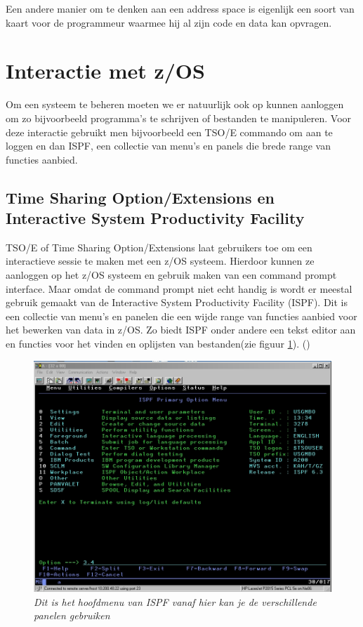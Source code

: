 Een andere manier om te denken aan een address space is eigenlijk een soort van kaart voor de programmeur waarmee hij al zijn code en data kan opvragen.

\section{Interactie met z/OS}
\label{sec:interactie met z/OS}

Om een systeem te beheren moeten we er natuurlijk ook op kunnen aanloggen om zo bijvoorbeeld programma's te schrijven of bestanden te manipuleren. Voor deze interactie gebruikt men bijvoorbeeld een TSO/E commando om aan te loggen en dan ISPF, een collectie van menu's en panels die brede range van functies aanbied.

\subsection{Time Sharing Option/Extensions en Interactive System Productivity Facility}
\label{subsec:Time Sharing Option}

TSO/E of Time Sharing Option/Extensions laat gebruikers toe om een interactieve sessie te maken met een z/OS systeem. Hierdoor kunnen ze aanloggen op het z/OS systeem en gebruik maken van een command prompt interface. Maar omdat de command prompt niet echt handig is wordt er meestal gebruik gemaakt van de Interactive System Productivity Facility (ISPF). Dit is een collectie van menu's en panelen die een wijde range van functies aanbied voor het bewerken van data in z/OS. Zo biedt ISPF onder andere een tekst editor aan en functies voor het vinden en oplijsten van bestanden(zie figuur \ref{fig:ispf}). (\cite{Parziale2017})

\begin{figure}[h]
	\centering
	\includegraphics[width=0.7\linewidth]{img/IPSF}
	\caption[ISPF hoofdmenu]{{\small \textit{Dit is het hoofdmenu van ISPF vanaf hier kan je de verschillende panelen gebruiken}}}
	\label{fig:ispf}
\end{figure}

